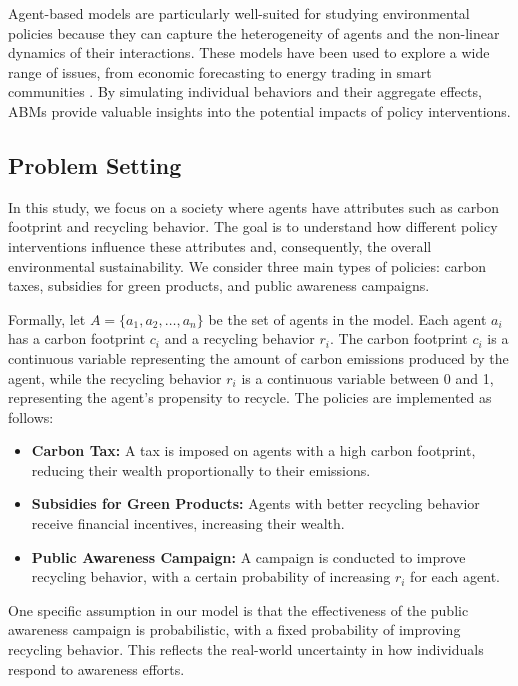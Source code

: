 \documentclass{article} %
\begin{document}
Agent-based models are particularly well-suited for studying environmental policies because they can capture the heterogeneity of agents and the non-linear dynamics of their interactions. These models have been used to explore a wide range of issues, from economic forecasting to energy trading in smart communities \citep{zhou2023peer}. By simulating individual behaviors and their aggregate effects, ABMs provide valuable insights into the potential impacts of policy interventions.

\subsection{Problem Setting}
In this study, we focus on a society where agents have attributes such as carbon footprint and recycling behavior. The goal is to understand how different policy interventions influence these attributes and, consequently, the overall environmental sustainability. We consider three main types of policies: carbon taxes, subsidies for green products, and public awareness campaigns.

Formally, let \( A = \{a_1, a_2, \ldots, a_n\} \) be the set of agents in the model. Each agent \( a_i \) has a carbon footprint \( c_i \) and a recycling behavior \( r_i \). The carbon footprint \( c_i \) is a continuous variable representing the amount of carbon emissions produced by the agent, while the recycling behavior \( r_i \) is a continuous variable between 0 and 1, representing the agent's propensity to recycle. The policies are implemented as follows:
\begin{itemize}
    \item \textbf{Carbon Tax:} A tax is imposed on agents with a high carbon footprint, reducing their wealth proportionally to their emissions.
    \item \textbf{Subsidies for Green Products:} Agents with better recycling behavior receive financial incentives, increasing their wealth.
    \item \textbf{Public Awareness Campaign:} A campaign is conducted to improve recycling behavior, with a certain probability of increasing \( r_i \) for each agent.
\end{itemize}

One specific assumption in our model is that the effectiveness of the public awareness campaign is probabilistic, with a fixed probability of improving recycling behavior. This reflects the real-world uncertainty in how individuals respond to awareness efforts.
\end{document}
